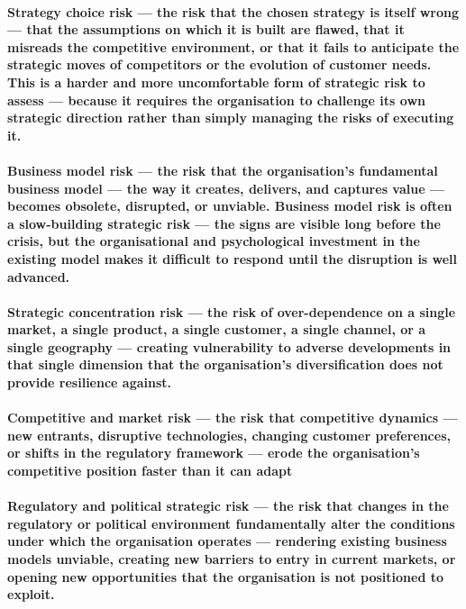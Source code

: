\paragraph{\textbf{Strategy choice risk} — the risk that the chosen strategy is itself wrong — that the assumptions on which it is built are flawed, that it misreads the competitive environment, or that it fails to anticipate the strategic moves of competitors or the evolution of customer needs. This is a harder and more uncomfortable form of strategic risk to assess — because it requires the organisation to challenge its own strategic direction rather than simply managing the risks of executing it.}
\paragraph{\textbf{Business model risk} — the risk that the organisation's fundamental business model — the way it creates, delivers, and captures value — becomes obsolete, disrupted, or unviable. Business model risk is often a slow-building strategic risk — the signs are visible long before the crisis, but the organisational and psychological investment in the existing model makes it difficult to respond until the disruption is well advanced.}
\paragraph{\textbf{Strategic concentration risk} — the risk of over-dependence on a single market, a single product, a single customer, a single channel, or a single geography — creating vulnerability to adverse developments in that single dimension that the organisation's diversification does not provide resilience against.}
\paragraph{\textbf{Competitive and market risk} — the risk that competitive dynamics — new entrants, disruptive technologies, changing customer preferences, or shifts in the regulatory framework — erode the organisation's competitive position faster than it can adapt}
\paragraph{\textbf{Regulatory and political strategic risk} — the risk that changes in the regulatory or political environment fundamentally alter the conditions under which the organisation operates — rendering existing business models unviable, creating new barriers to entry in current markets, or opening new opportunities that the organisation is not positioned to exploit.}
